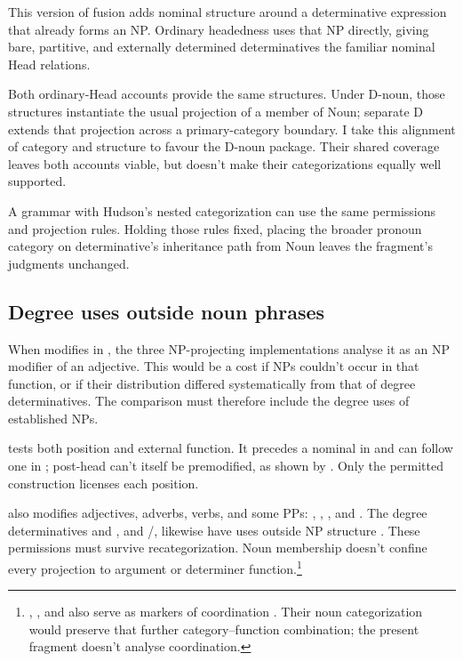 \documentclass[12pt]{article}
\begin{document}
This version of fusion adds nominal structure around a determinative expression that already forms an NP. Ordinary headedness uses that NP directly, giving bare, partitive, and externally determined determinatives the familiar nominal Head relations.

Both ordinary-Head accounts provide the same structures. Under D-noun, those structures instantiate the usual projection of a member of Noun; separate D extends that projection across a primary-category boundary. I take this alignment of category and structure to favour the D-noun package. Their shared coverage leaves both accounts viable, but doesn't make their categorizations equally well supported.

A grammar with Hudson's nested categorization can use the same permissions and projection rules. Holding those rules fixed, placing the broader pronoun category on determinative's inheritance path from Noun leaves the fragment's judgments unchanged.

\subsection{Degree uses outside noun phrases}\label{sec:enough}

When  modifies  in , the three NP-projecting implementations analyse it as an NP modifier of an adjective. This would be a cost if NPs couldn't occur in that function, or if their distribution differed systematically from that of degree determinatives. The comparison must therefore include the degree uses of established NPs.

 tests both position and external function. It precedes a nominal in  and can follow one in ; post-head  can't itself be premodified, as shown by  \citep[396--397, 445]{huddleston2002}. Only the permitted construction licenses each position.

 also modifies adjectives, adverbs, verbs, and some PPs: , , , and  \citep[396--397]{huddleston2002}. The degree determinatives  and , and /, likewise have uses outside NP structure \citep[390, 395--397]{huddleston2002}. These permissions must survive recategorization. Noun membership doesn't confine every projection to argument or determiner function.\footnote{, , and  also serve as markers of coordination \citep[1305, 1308]{huddleston2002}. Their noun categorization would preserve that further category--function combination; the present fragment doesn't analyse coordination.}
\end{document}
